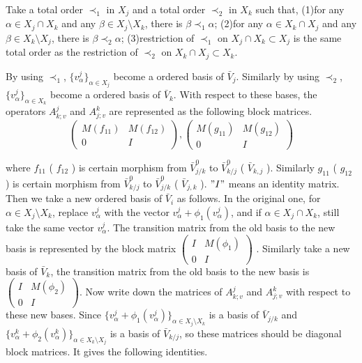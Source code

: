 \def\CTEXPreproc{Created by ctex v0.2.12, don't edit!}\documentclass[11pt]{article}
\begin{document}
Take a total order $\prec_{1}$ in $X_j$ and a total order $\prec_2$ in $X_k$ such that,
(1)for any $\alpha \in X_j \cap X_k $ and any
$\beta \in X_j \setminus X_k$, there is $\beta \prec_1 \alpha$;
(2)for any $\alpha \in X_k \cap X_j $ and any
$\beta \in X_k \setminus X_j$, there is $\beta \prec_2 \alpha$;
 (3)restriction of $\prec_1$ on $X_j \cap X_k \subset X_j$ is the same total order as the restriction of $\prec_2$ on $X_k \cap X_j \subset X_k$.

 By using $\prec_1$, $\{ v^j _{\alpha} \}_{\alpha \in X_j }$ become a ordered basis of $\bar{V}_j$. Similarly by using  $\prec_2$, $\{ v^j _{\alpha} \}_{\alpha \in X_k }$ become a ordered basis of $\bar{V}_k$. With respect to these bases,
the operators $A^j _{k;v}$ and $A^k _{j;v}$ are represented as the following block matrices.
\[
\begin{pmatrix}
 M (f_{11}) &  M(f_{12})\\
0 &  I
\end{pmatrix}     ,      \begin{pmatrix}
M( g_{11}) &  M(g_{12})\\
0 &  I
\end{pmatrix}
\]

where $f_{11}$ ( $f_{12}$ ) is certain morphism from $\bar{V}^0 _{j/k} $ to
$\bar{V}^0 _{k/j} $ ( $ \bar{V}_{k,j} $     ). Similarly $g_{11}$ ( $g_{12}$ ) is certain morphism from $\bar{V}^0 _{k/j} $ to
$\bar{V}^0 _{j/k}$ ( $\bar{V}_{j,k}$     ).
 $"I"$ means an identity matrix.    Then we take a new ordered basis of $\bar{V}_i$ as follows. In the original one, for
 $\alpha \in X_j \setminus X_k$, replace $v^j _{\alpha} $ with the vector $v^j _{\alpha} + \phi_1 ( v^j _{\alpha} ) $, and if
 $\alpha \in X_j \cap X_k$, still take the same vector $v^j _{\alpha}$. The transition matrix from the old basis to the new basis
 is represented by the block matrix
 $\begin{pmatrix}
 I &  M( \phi_1 )\\
0 &  I
\end{pmatrix} $ . Similarly take a new basis of $\bar{V}_k$, the transition matrix from the old basis to the new basis is
$\begin{pmatrix}
 I &  M( \phi_2 )\\
0 &  I
\end{pmatrix} $.  Now write down the matrices of $A^j _{k;v}$ and $A^k _{j;v}$ with respect to these new bases. Since $\{ v^j _{\alpha} + \phi_1 ( v^j _{\alpha} ) \}_{\alpha \in X_j \setminus X_k } $ is a basis of $\bar{V}_{j/k}$ and  $\{ v^k _{\alpha} + \phi_2 ( v^k _{\alpha} ) \}_{\alpha \in X_k \setminus X_j } $ is a basis of $\bar{V}_{k/j}$, so these matrices should be diagonal block matrices. It gives the following identities.
\end{document}
